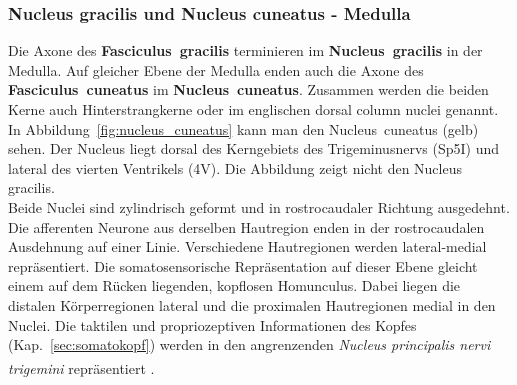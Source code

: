 \subsubsection*{Nucleus gracilis und Nucleus cuneatus - Medulla}

Die Axone des \textbf{Fasciculus~gracilis} terminieren im \textbf{Nucleus~gracilis}  in der Medulla. Auf gleicher Ebene der Medulla enden auch die Axone des \textbf{Fasciculus~cuneatus} im \textbf{Nucleus~cuneatus}. Zusammen werden die beiden Kerne auch Hinterstrangkerne oder im englischen dorsal column nuclei genannt. In Abbildung~\ref{fig:nucleus_cuneatus} kann man den Nucleus~cuneatus (gelb) sehen. Der Nucleus liegt dorsal des Kerngebiets des Trigeminusnervs (Sp5I) und lateral des vierten Ventrikels (4V). Die Abbildung zeigt nicht den Nucleus gracilis.
\\
\noindent
Beide Nuclei sind zylindrisch geformt und in rostrocaudaler Richtung ausgedehnt. Die afferenten Neurone aus derselben Hautregion enden in der rostrocaudalen Ausdehnung auf einer Linie. Verschiedene Hautregionen werden lateral-medial repräsentiert. Die somatosensorische Repräsentation auf dieser Ebene gleicht einem auf dem Rücken liegenden, kopflosen Homunculus. Dabei liegen die distalen Körperregionen lateral und die proximalen Hautregionen medial in den Nuclei. Die taktilen und propriozeptiven Informationen des Kopfes (Kap.~\ref{sec:somatokopf}) werden in den angrenzenden \textit{Nucleus principalis nervi trigemini}  repräsentiert \textsuperscript{\cite[Kap.~22]{kandel2013principles}}. 

